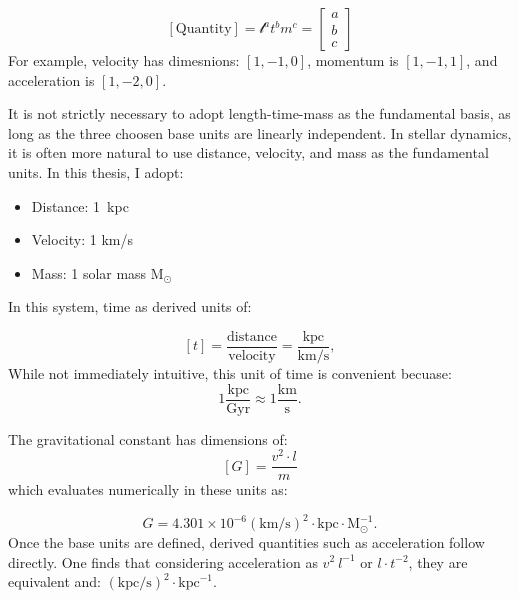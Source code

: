     \begin{equation}
        \left[\mathrm{Quantity}\right] = \mathcal{l}^a t^b m^c =
            \begin{bmatrix}
                a\\
                b\\
                c 
            \end{bmatrix}
    \end{equation}
    For example, velocity has dimesnions: $\left[1, -1, 0\right]$, momentum is $[1,-1,1]$, and acceleration is $[1,-2,0]$. 

    It is not strictly necessary to adopt length-time-mass as the fundamental basis, as long as the three choosen base units are linearly independent. In stellar dynamics, it is often more natural to use distance, velocity, and mass as the fundamental units. In this thesis, I adopt:
    \begin{itemize}
        \item Distance: 1~kpc
        \item Velocity: 1 km/s 
        \item Mass: 1 solar mass $\mathrm{M}_\odot$
    \end{itemize}

    In this system, time as derived units of: 

    \begin{equation}
        \left[t\right] = \frac{\mathrm{distance}}{\mathrm{velocity}} = \frac{\mathrm{kpc}}{\mathrm{km/s}},
    \end{equation}
    While not immediately intuitive, this unit of time is convenient becuase: 
    \begin{equation}
        1\frac{\mathrm{kpc}}{\mathrm{Gyr}} \approx 1\frac{\mathrm{km}}{\mathrm{s}}.
    \end{equation}

    The gravitational constant has dimensions of:
    \begin{equation}    
        \left[G\right]=\frac{v^2 \cdot l}{m}
    \end{equation} 
    which evaluates numerically in these units as: 
    
    \begin{equation}
        G = 4.301 \times 10^{-6} \left(\mathrm{km}/\mathrm{s}\right)^2 \cdot \mathrm{kpc} \cdot \mathrm{M}_\odot^{-1}.
    \end{equation}
    Once the base units are defined, derived quantities such as acceleration follow directly. One finds that considering acceleration as $v^2~l^{-1}$ or $l\cdot t^{-2}$, they are equivalent and: $\left(\mathrm{kpc}/\mathrm{s}\right)^2 \cdot \mathrm{kpc}^{-1}$. 

